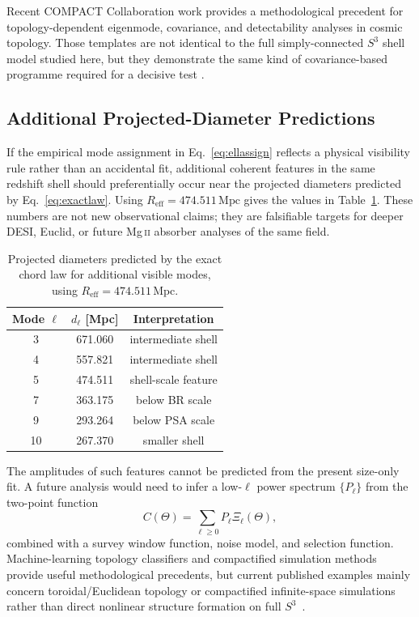\documentclass[
  aps,
  prd,
  reprint,
  superscriptaddress,
  nofootinbib,
  longbibliography,
  floatfix,
  amsmath,
  amssymb
]{revtex4-2}
\theoremstyle{plain}
\theoremstyle{definition}
\theoremstyle{remark}
\newcommand{\Reff}{R_{\mathrm{eff}}}
\begin{document}
Recent COMPACT Collaboration work provides a methodological precedent
for topology-dependent eigenmode, covariance, and detectability analyses
in cosmic topology. Those templates are not identical to the full
simply-connected $S^3$ shell model studied here, but they demonstrate the
same kind of covariance-based programme required for a decisive test
\cite{COMPACT2024PRL,COMPACT2024IIa}.

\subsection{Additional Projected-Diameter Predictions}
\label{subsec:additional-predictions}

If the empirical mode assignment in Eq.~\eqref{eq:ellassign} reflects a
physical visibility rule rather than an accidental fit, additional
coherent features in the same redshift shell should preferentially occur
near the projected diameters predicted by
Eq.~\eqref{eq:exactlaw}. Using $\Reff=474.511\,\mathrm{Mpc}$ gives the
values in Table~\ref{tab:predictions}. These numbers are not new
observational claims; they are falsifiable targets for deeper DESI,
Euclid, or future Mg\,\textsc{ii} absorber analyses of the same field.

\begin{table}[t]
\centering
\scriptsize
\caption{Projected diameters predicted by the exact chord law for
additional visible modes, using $\Reff=474.511\,\mathrm{Mpc}$.}
\label{tab:predictions}
\begin{tabular}{ccc}
\toprule
Mode $\ell$ & $d_\ell$ [Mpc] & Interpretation \\
\midrule
3  & 671.060 & intermediate shell \\
4  & 557.821 & intermediate shell \\
5  & 474.511 & shell-scale feature \\
7  & 363.175 & below BR scale \\
9  & 293.264 & below PSA scale \\
10 & 267.370 & smaller shell \\
\bottomrule
\end{tabular}
\end{table}

The amplitudes of such features cannot be predicted from the present
size-only fit. A future analysis would need to infer a low-$\ell$ power
spectrum $\{P_\ell\}$ from the two-point function
\begin{equation}
  C(\Theta)=\sum_{\ell\ge 0}P_\ell\Xi_\ell(\Theta),
\end{equation}
combined with a survey window function, noise model, and selection
function. Machine-learning topology classifiers and compactified
simulation methods provide useful methodological precedents, but current
published examples mainly concern toroidal/Euclidean topology or
compactified infinite-space simulations rather than direct nonlinear
structure formation on full $S^3$~\cite{Tamosiunas2024,Racz2018}.
\end{document}
